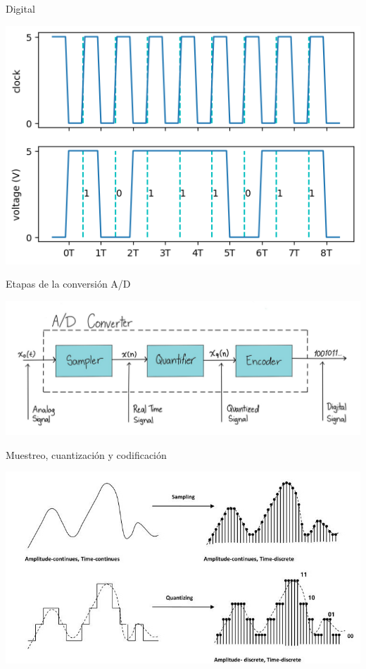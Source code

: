 \documentclass[aspectratio=169]{beamer}
\begin{document}
\begin{frame}{Digital}
\begin{center}
    \includegraphics[width=0.7\linewidth]{presentaciones/fig/digitalsignal.png}
\end{center}
\end{frame}

\begin{frame}{Etapas de la conversión A/D}
\begin{center}
    \includegraphics[width=0.93\linewidth]{presentaciones/fig/convAD.jpg}
\end{center}
\end{frame}

\begin{frame}{Muestreo, cuantización y codificación}
\begin{center}
    \includegraphics[width=0.9\linewidth]{presentaciones/fig/muestreo.jpg}
\end{center}
\end{frame}
\end{document}
